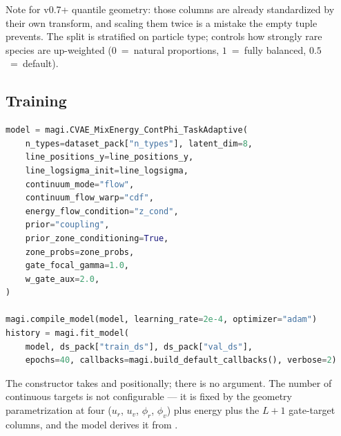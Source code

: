 \documentclass[11pt,a4paper]{article}
\begin{document}
Note  for v0.7+ quantile geometry: those columns are
already standardized by their own transform, and scaling them twice is a
mistake the empty tuple prevents. The split is stratified on particle type;
 controls how strongly rare species are up-weighted
($0$~=~natural proportions, $1$~=~fully balanced, $0.5$~=~default).

\subsection{Training}

\begin{lstlisting}[language=Python]
model = magi.CVAE_MixEnergy_ContPhi_TaskAdaptive(
    n_types=dataset_pack["n_types"], latent_dim=8,
    line_positions_y=line_positions_y,
    line_logsigma_init=line_logsigma,
    continuum_mode="flow",
    continuum_flow_warp="cdf",
    energy_flow_condition="z_cond",
    prior="coupling",
    prior_zone_conditioning=True,
    zone_probs=zone_probs,
    gate_focal_gamma=1.0,
    w_gate_aux=2.0,
)

magi.compile_model(model, learning_rate=2e-4, optimizer="adam")
history = magi.fit_model(
    model, ds_pack["train_ds"], ds_pack["val_ds"],
    epochs=40, callbacks=magi.build_default_callbacks(), verbose=2)
\end{lstlisting}

The constructor takes  and 
positionally; there is no  argument. The number of continuous
targets is not configurable --- it is fixed by the geometry parametrization at
four ($u_r$, $u_v$, $\phi_r$, $\phi_v$) plus energy plus the $L+1$ gate-target
columns, and the model derives it from .
\end{document}
